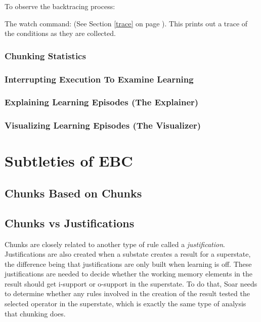 \begin{itemize}
To observe the backtracing process:

The watch command:  (See Section \ref{trace} on page \pageref{trace}). This prints out a trace of the conditions as they are collected.

\subsubsection{Chunking Statistics}

\subsubsection{Interrupting Execution To Examine Learning}

\subsubsection{Explaining Learning Episodes (The Explainer)}

\subsubsection{Visualizing Learning Episodes (The Visualizer)}


\section{Subtleties of EBC}
\label{CHUNKING-subtleties}


\subsection{Chunks Based on Chunks}

\subsection{Chunks vs Justifications}

Chunks are closely related to another type of rule called a \textit{justification}.  Justifications are also created when a substate creates a result for a superstate, the difference being that justifications are only built when learning is off.  These justifications are needed to decide whether the working memory elements in the result should get i-support or o-support in the superstate.  To do that, Soar needs to determine whether any rules involved in the creation of the result tested the selected operator in the superstate, which is exactly the same type of analysis that chunking does.


\end{itemize}
